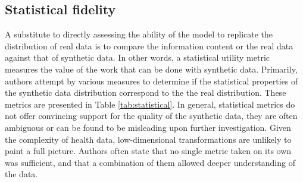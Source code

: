     \subsection{Statistical fidelity}
        A substitute to directly assessing the ability of the model to replicate the distribution of real data is to compare the information content or the real data against that of synthetic data. In other words, a statistical utility metric measures the value of the work that can be done with synthetic data. Primarily, authors attempt by various measures to determine if the statistical properties of the synthetic data distribution correspond to the the real distribution. These metrics are presented in Table \ref{tab:statistical}. In general, statistical metrics do not offer convincing support for the quality of the synthetic data, they are often ambiguous or can be found to be misleading upon further investigation. Given the complexity of health data, low-dimensional transformations are unlikely to paint a full picture. Authors often state that no single metric taken on its own was sufficient, and that a combination of them allowed deeper understanding of the data. 
     
